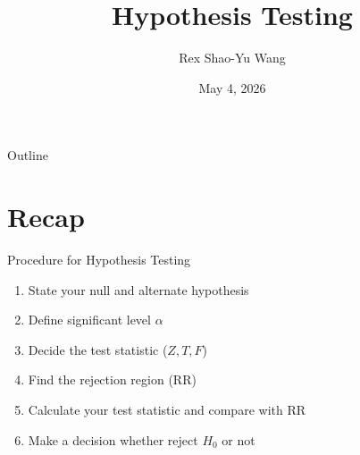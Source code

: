 \documentclass[aspectratio=169]{beamer}
\title{Hypothesis Testing}
\author{Rex Shao-Yu Wang}
\institute{Department of Agronomy, National Taiwan University}
\date{May 4, 2026}
\begin{document}
\begin{frame}
  \titlepage
\end{frame}

\begin{frame}{Outline}
  \tableofcontents
\end{frame}


\section{Recap}
\begin{frame}{Procedure for Hypothesis Testing}
\begin{enumerate}
    \item State your null and alternate hypothesis
    \item Define significant level $\alpha$
    \item Decide the test statistic ($Z, T,F $)
    \item Find the rejection region (RR)
    \item Calculate your test statistic and compare with RR
    \item Make a decision whether reject $H_0$ or not
\end{enumerate}
\end{frame}
\end{document}
